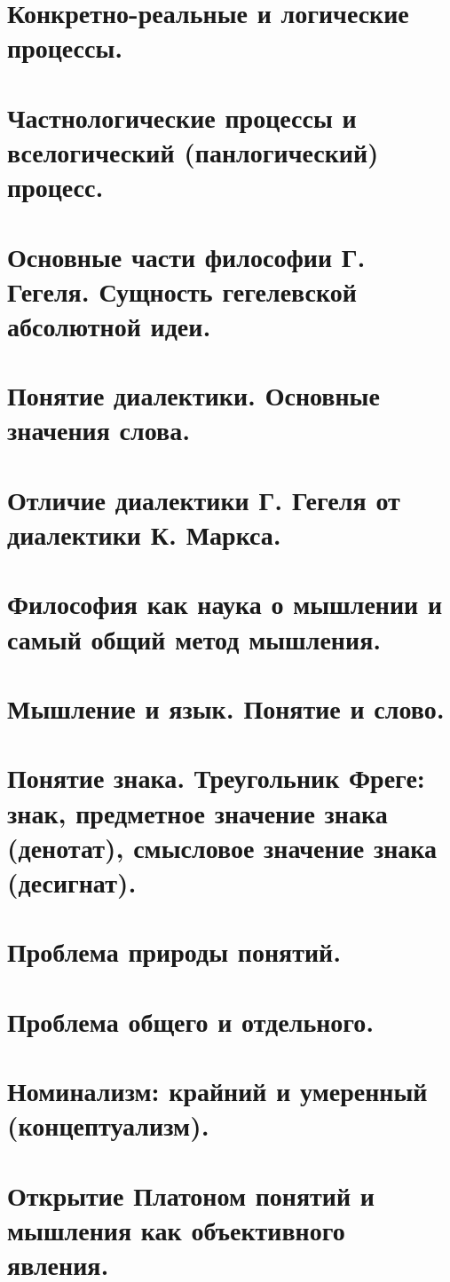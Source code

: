 \section{ Конкретно-реальные и логические процессы.}
\section{ Частнологические процессы и вселогический (панлогический) процесс.}
\section{ Основные части философии Г. Гегеля. Сущность гегелевской абсолютной идеи.}
\section{ Понятие диалектики. Основные значения слова.}
\section{ Отличие диалектики Г. Гегеля от диалектики К. Маркса.}
\section{ Философия как наука о мышлении и самый общий метод мышления.}
\section{ Мышление и язык. Понятие и слово.}
\section{ Понятие знака. Треугольник Фреге: знак, предметное значение знака (денотат), смысловое значение знака (десигнат).}
\section{ Проблема природы понятий.}
\section{ Проблема общего и отдельного.}
\section{ Номинализм: крайний и умеренный (концептуализм).}
\section{ Открытие Платоном понятий и мышления как объективного явления.}
